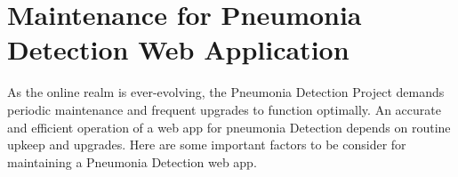 %

\chapter{Maintenance for Pneumonia Detection Web Application}

As the online realm is ever-evolving, the Pneumonia Detection Project demands periodic maintenance and frequent upgrades to function optimally. An accurate and efficient operation of a web app for pneumonia Detection depends on routine upkeep and upgrades. Here are some important factors to be consider for maintaining a  Pneumonia Detection web app.

